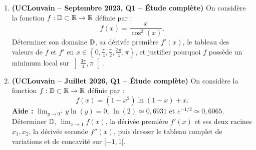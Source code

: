 \begin{enumerate}[label=\textbf{Exercice 4.\arabic* --}]
    \item \textbf{(UCLouvain -- Septembre 2023, Q1 -- Étude complète)} On considère la fonction $f : \mathbb{D} \subset \mathbb{R} \to \mathbb{R}$ définie par :
    \[
        f(x) = \frac{x}{\cos^2(x)}.
    \]
    Déterminer son domaine $\mathbb{D}$, sa dérivée première $f'(x)$, le tableau des valeurs de $f$ et $f'$ en $x \in \left\{0, \frac{\pi}{4}, \frac{\pi}{2}, \frac{3\pi}{4}, \pi\right\}$, et justifier pourquoi $f$ possède un minimum local sur $\left]\frac{3\pi}{4}, \pi\right[$.

    \item \textbf{(UCLouvain -- Juillet 2026, Q1 -- Étude complète)} On considère la fonction $f : \mathbb{D} \subset \mathbb{R} \to \mathbb{R}$ définie par :
    \[
        f(x) = (1 - x^2)\ln(1 - x) + x.
    \]
    \textbf{Aide :} $\lim_{y \to 0^+} y\ln(y) = 0$, $\ln(2) \simeq 0,6931$ et $e^{-1/2} \simeq 0,6065$.
    Déterminer $\mathbb{D}$, $\lim_{x \to 1} f(x)$, la dérivée première $f'(x)$ et ses deux racines $x_1, x_2$, la dérivée seconde $f''(x)$, puis dresser le tableau complet de variations et de concavité sur $[-1, 1[$.
\end{enumerate}
